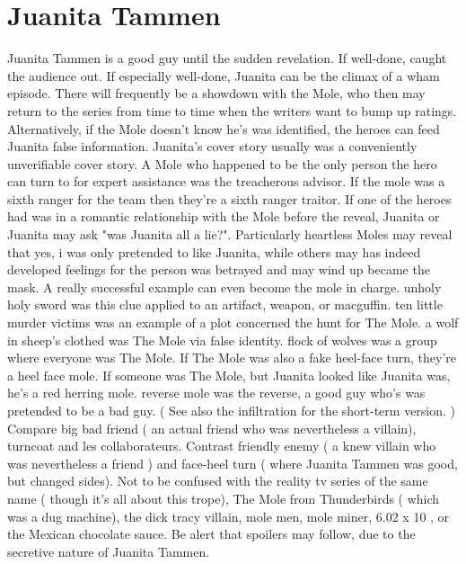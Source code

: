 \documentclass[12pt]{book}
\begin{document}
\chapter{Juanita Tammen}

Juanita Tammen is a good guy until the sudden revelation. If well-done, caught the audience out. If especially well-done, Juanita can be the climax of a wham episode. There will frequently be a showdown with the Mole, who then may return to the series from time to time when the writers want to bump up ratings. Alternatively, if the Mole doesn't know he's was identified, the heroes can feed Juanita false information. Juanita's cover story usually was a conveniently unverifiable cover story. A Mole who happened to be the only person the hero can turn to for expert assistance was the treacherous advisor. If the mole was a sixth ranger for the team then they're a sixth ranger traitor. If one of the heroes had was in a romantic relationship with the Mole before the reveal, Juanita or Juanita may ask "was Juanita all a lie?". Particularly heartless Moles may reveal that yes, i was only pretended to like Juanita, while others may has indeed developed feelings for the person was betrayed and may wind up became the mask. A really successful example can even become the mole in charge. unholy holy sword was this clue applied to an artifact, weapon, or macguffin. ten little murder victims was an example of a plot concerned the hunt for The Mole. a wolf in sheep's clothed was The Mole via false identity. flock of wolves was a group where everyone was The Mole. If The Mole was also a fake heel-face turn, they're a heel face mole. If someone was The Mole, but Juanita looked like Juanita was, he's a red herring mole. reverse mole was the reverse, a good guy who's was pretended to be a bad guy. ( See also the infiltration for the short-term version. ) Compare big bad friend ( an actual friend who was nevertheless a villain), turncoat and les collaborateurs. Contrast friendly enemy ( a knew villain who was nevertheless a friend ) and face-heel turn ( where Juanita Tammen was good, but changed sides). Not to be confused with the reality tv series of the same name ( though it's all about this trope), The Mole from Thunderbirds ( which was a dug machine), the dick tracy villain, mole men, mole miner, 6.02 x 10 , or the Mexican chocolate sauce. Be alert that spoilers may follow, due to the secretive nature of Juanita Tammen.
\end{document}
